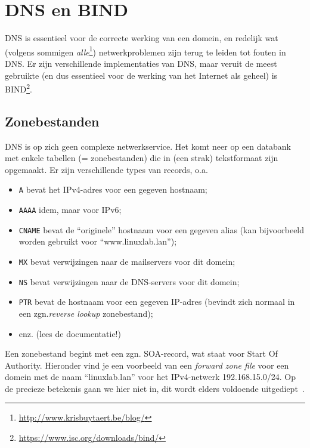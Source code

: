 \section{DNS en BIND}
\label{sec:dns-en-bind}


DNS is essentieel voor de correcte werking van een domein, en redelijk wat (volgens sommigen \emph{alle}\footnote{\url{http://www.krisbuytaert.be/blog/}}) netwerkproblemen zijn terug te leiden tot fouten in DNS. Er zijn verschillende implementaties van DNS, maar veruit de meest gebruikte (en dus essentieel voor de werking van het Internet als geheel) is BIND\footnote{\url{https://www.isc.org/downloads/bind/}}.

\subsection{Zonebestanden}
\label{ssec:zonebestanden}

DNS is op zich geen complexe netwerkservice. Het komt neer op een databank met enkele tabellen (= zonebestanden) die in (een strak) tekstformaat zijn opgemaakt. Er zijn verschillende types van records, o.a.

\begin{itemize}
\item \texttt{A} bevat het IPv4-adres voor een gegeven hostnaam;
\item \texttt{AAAA} idem, maar voor IPv6;
\item \texttt{CNAME} bevat de ``originele'' hostnaam voor een gegeven alias (kan bijvoorbeeld worden gebruikt voor ``www.linuxlab.lan'');
\item \texttt{MX} bevat verwijzingen naar de mailservers voor dit domein;
\item \texttt{NS} bevat verwijzingen naar de DNS-servers voor dit domein;
\item \texttt{PTR} bevat de hostnaam voor een gegeven IP-adres (bevindt zich normaal in een zgn.\emph{reverse lookup} zonebestand);
\item enz. (lees de documentatie!)
\end{itemize}

Een zonebestand begint met een zgn. SOA-record, wat staat voor Start Of Authority. Hieronder vind je een voorbeeld van een \emph{forward zone file} voor een domein met de naam ``linuxlab.lan'' voor het IPv4-netwerk 192.168.15.0/24. Op de precieze betekenis gaan we hier niet in, dit wordt elders voldoende uitgediept~\autocite{Aitchison2015}.

